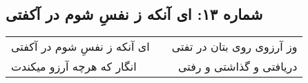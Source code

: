 \begin{center}
\section*{شماره ۱۳: ای آنکه ز نفسِ شوم در آکفتی}
\label{sec:013}
\begin{longtable}{l p{0.5cm} r}
ای آنکه ز نفسِ شوم در آکفتی
&&
وز آرزوی روی بتان در تفتی
\\
انگار که هرچه آرزو میکندت
&&
دریافتی و گذاشتی و رفتی
\\
\end{longtable}
\end{center}
